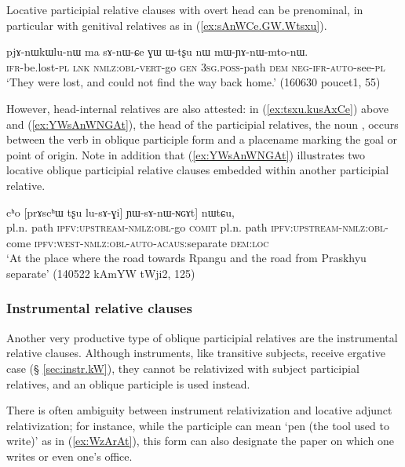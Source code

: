 Locative participial relative clauses with overt head can be prenominal, in particular with genitival relatives as in (\ref{ex:sAnWCe.GW.Wtsxu}). 

\begin{exe}
\ex \label{ex:sAnWCe.GW.Wtsxu}
\gll  pjɤ-nɯkɯlu-nɯ ma sɤ-nɯ-ɕe ɣɯ ɯ-tʂu nɯ mɯ-ɲɤ-nɯ-mto-nɯ. \\
\textsc{ifr}-be.lost-\textsc{pl}  \textsc{lnk} \textsc{nmlz}:\textsc{obl}-\textsc{vert}-go \textsc{gen} \textsc{3sg}.\textsc{poss}-path \textsc{dem} \textsc{neg}-\textsc{ifr}-\textsc{auto}-see-\textsc{pl} \\
\glt `They were lost, and could not find the way back home.' (160630 poucet1, 55)
\end{exe}

However, head-internal relatives are also attested: in (\ref{ex:tsxu.kusAxCe}) above and (\ref{ex:YWsAnWNGAt}), the head of the participial relatives, the noun , occurs between the verb in oblique participle form and a placename marking the goal or point of origin. Note in addition that (\ref{ex:YWsAnWNGAt}) illustrates two locative oblique participial relative clauses embedded within another participial relative.

\begin{exe}
\ex \label{ex:YWsAnWNGAt}
\gll   [[rpɤŋgɯ tʂu lu-sɤx-ɕe] cʰo [prɤscʰɯ tʂu lu-sɤ-ɣi] ɲɯ-sɤ-nɯ-ɴɢɤt] nɯtɕu, \\
pl.n.  path \textsc{ipfv}:\textsc{upstream}-\textsc{nmlz}:\textsc{obl}-go \textsc{comit} pl.n.  path \textsc{ipfv}:\textsc{upstream}-\textsc{nmlz}:\textsc{obl}-come \textsc{ipfv}:\textsc{west}-\textsc{nmlz}:\textsc{obl}-\textsc{auto}-\textsc{acaus}:separate \textsc{dem}:\textsc{loc} \\
\glt `At the place where the road towards Rpangu and the road from Praskhyu separate' (140522 kAmYW tWji2, 125)
\end{exe}

\subsubsection{Instrumental relative clauses} \label{sec:instrumental.participle.relatives}
Another very productive type of oblique participial relatives are the instrumental relative clauses. Although instruments, like transitive subjects, receive ergative case (§ \ref{sec:instr.kW}), they cannot be relativized with subject participial relatives, and an oblique participle is used instead.

There is often ambiguity between instrument relativization and locative adjunct relativization; for instance, while the participle  can mean `pen (the tool used to write)' as in (\ref{ex:WzArAt}), this form can also designate the paper on which one writes or even one's office.

